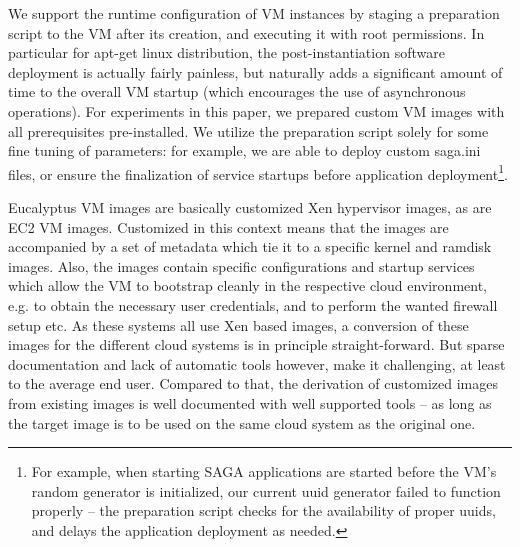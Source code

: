 \documentclass[3p,twocolumn]{elsarticle}
\begin{document}
We support the runtime configuration of VM instances by staging a
preparation script to the VM after its creation, and executing it with
root permissions.  In particular for apt-get linux distribution, the
post-instantiation software deployment is actually fairly painless,
but naturally adds a significant amount of time to the overall VM
startup (which encourages the use of asynchronous operations).
For experiments in this paper, we prepared custom VM images with all
prerequisites pre-installed.  We utilize the preparation script solely
for some fine tuning of parameters: for example, we are able to deploy
custom saga.ini files, or ensure the finalization of service startups
before application deployment\footnote{For example, when starting SAGA
  applications are started before the VM's random generator is
  initialized, our current uuid generator failed to function properly
  -- the preparation script checks for the availability of proper
  uuids, and delays the application deployment as needed.}.

 Eucalyptus VM images are basically customized
Xen hypervisor images, as are EC2 VM images.  Customized in this
context means that the images are accompanied by a set of metadata
which tie it to a specific kernel and ramdisk images.  Also, the
images contain specific configurations and startup services which
allow the VM to bootstrap cleanly in the respective cloud environment,
e.g. to obtain the necessary user credentials, and to perform the
wanted firewall setup etc.  As these systems all use Xen based images,
a conversion of these images for the different cloud systems is in
principle straight-forward.  But sparse documentation and lack of
automatic tools however, make it challenging, at least to the average
end user. Compared to that, the derivation of customized images from
existing images is well documented with well supported tools -- as
long as the target image is to be used on the same cloud system as the
original one.
\end{document}
